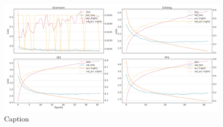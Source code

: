 \begin{figure}[!htb]
    \centering
    \includegraphics[width=\textwidth]{gfx/bpic2015_1/windowed_loss_acc_curve.png}
    \caption{Caption}
    \label{fig:my_label}
\end{figure}
\FloatBarrier

